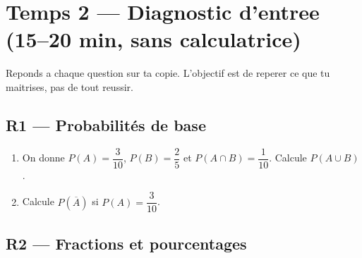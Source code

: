 
\section*{Temps 2 --- Diagnostic d'entree \hfill
\normalfont\small(15--20 min, sans calculatrice)}

Reponds a chaque question sur ta copie. L'objectif est de reperer ce que tu maitrises, pas de tout reussir.

\bigskip

\subsection*{R1 --- Probabilités de base}

\begin{enumerate}

  \item On donne $P(A) = \dfrac{3}{10}$, $P(B) = \dfrac{2}{5}$ et $P(A \cap B) = \dfrac{1}{10}$. Calcule $P(A \cup B)$.

  \item Calcule $P(\overline{A})$ si $P(A) = \dfrac{3}{10}$.

\end{enumerate}

\subsection*{R2 --- Fractions et pourcentages}

